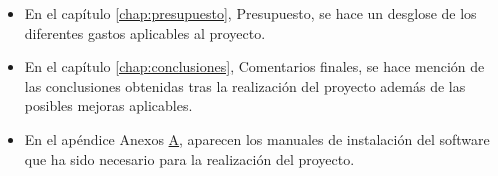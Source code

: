 \begin{itemize}
\item En el capítulo \ref{chap:presupuesto}, Presupuesto, se hace un desglose de los diferentes gastos aplicables al proyecto. 

\item En el capítulo \ref{chap:conclusiones}, Comentarios finales, se hace mención de las conclusiones obtenidas tras la realización del proyecto además de las posibles mejoras aplicables.

\item En el apéndice Anexos  \hyperref[appendix:anexos]{A}, aparecen los manuales de instalación del software que ha sido necesario para la realización del proyecto.

\end{itemize}
